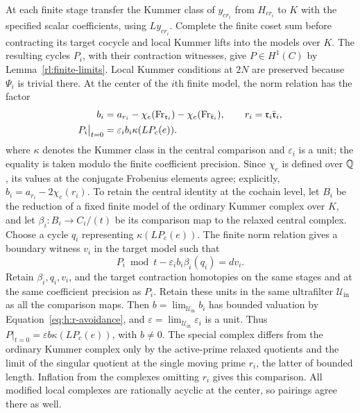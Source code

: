 At each finite stage transfer the Kummer class of $y_{cr_i}$ from
$H_{cr_i}$ to $K$ with the specified scalar coefficients, using
$Ly_{cr_i}$. Complete the finite coset sum before contracting its
target cocycle and local Kummer lifts into the models over $K$.
The resulting cycles $P_i$, with their contraction witnesses, give
$P\in H^1(C)$ by Lemma~\ref{rl:finite-limits}.
Local Kummer conditions at $2N$ are preserved because $\Psi_i$ is
trivial there. At the center of the $i$th finite model, the norm relation
has the factor
\begin{equation}\label{eq:h:trace-center}
 \begin{aligned}
 b_i&=a_{r_i}-\chi_e(\operatorname{Fr}_{\mathfrak r_i})
            -\chi_e(\operatorname{Fr}_{\bar{\mathfrak r}_i}),
 \qquad r_i=\mathfrak r_i\bar{\mathfrak r}_i,\\
 P_i\big|_{t=0}&=\varepsilon_i b_i\kappa(LP_c(e)).
 \end{aligned}
\end{equation}
where $\kappa$ denotes the Kummer class in the central comparison
and $\varepsilon_i$ is a unit; the equality is taken modulo the finite
coefficient precision. Since $\chi_e$ is defined over $\mathbb Q$, its values
at the conjugate Frobenius elements agree; explicitly,
$b_i=a_{r_i}-2\chi_e(r_i)$.
To retain the central identity at the cochain level, let $B_i$ be the
reduction of a fixed finite model of the ordinary Kummer complex over
$K$, and let $\beta_i:B_i\to C_i/(t)$ be its comparison map to the
relaxed central complex. Choose a cycle $q_i$ representing
$\kappa(LP_c(e))$. The finite norm relation gives a boundary witness
$v_i$ in the target model such that
\[
 P_i\bmod t-\varepsilon_i b_i\beta_i(q_i)=d v_i.
\]
Retain $\beta_i,q_i,v_i$, and the target contraction homotopies on
the same stages and at the same coefficient precision as $P_i$.
Retain these units in the same ultrafilter
$\mathcal U_{\mathrm{in}}$ as all the comparison maps. Then
$b=\lim_{\mathcal U_{\mathrm{in}}}b_i$ has bounded valuation by
Equation~\eqref{eq:h:r-avoidance}, and
$\varepsilon=\lim_{\mathcal U_{\mathrm{in}}}\varepsilon_i$ is a unit. Thus
$P|_{t=0}=\varepsilon b\kappa(LP_c(e))$, with $b\ne0$.
The special complex differs from the ordinary Kummer complex only by
the active-prime relaxed quotients and the limit of the singular
quotient at the single moving prime $r_i$, the latter of bounded length.
Inflation from the complexes omitting $r_i$ gives this comparison. All modified
local complexes are rationally acyclic at the center, so pairings agree
there as well.

